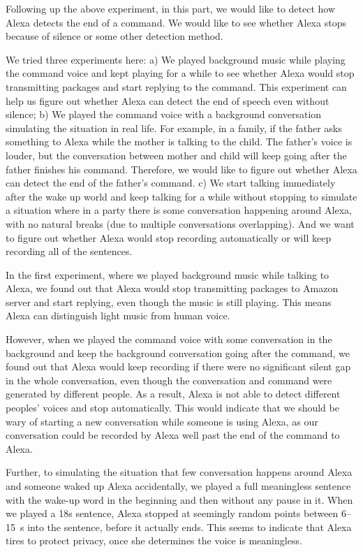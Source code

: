 Following up the above experiment, in this part, we would like to detect how Alexa detects the end of a command. We would like to see whether Alexa stops because of silence or some other detection method.

We tried three experiments here: a) We played background music while playing the command voice and kept playing for a while to see whether Alexa would stop transmitting packages and start replying to the command. This experiment can help us figure out whether Alexa can detect the end of speech even without silence; b) We played the command voice with a background conversation simulating the situation in real life. For example, in a family, if the  father asks something to Alexa while the mother is talking to the child. The father's voice is louder, but the conversation between mother and child will keep going after the father finishes his command. Therefore, we would like to figure out whether Alexa can detect the end of the father's command. c) We start talking immediately after the wake up world and keep talking for a while without stopping to simulate a situation where in a party there is some conversation happening around Alexa, with no natural breaks (due to multiple conversations overlapping). And we want to figure out whether Alexa would stop recording automatically or will keep recording all of the sentences.

In the first experiment, where we played background music while talking to Alexa, we found out that Alexa would stop transmitting packages to Amazon server and start replying, even though the music is still playing. This means Alexa can distinguish light music from human voice.

However, when we played the command voice with some conversation in the background and keep the background conversation going after the command, we found out that Alexa would keep recording if there were no significant silent gap in the whole conversation, even though the conversation and command were generated by different people. As a result, Alexa is not able to detect different peoples' voices and stop automatically. This would indicate that we should be wary of starting a new conversation while someone is using Alexa, as our conversation could be recorded by Alexa well past the end of the command to Alexa. 

Further, to simulating the situation that few conversation happens around Alexa and someone waked up Alexa accidentally, we played a full meaningless sentence with the wake-up word in the beginning and then without any pause in it. When we played a 18s sentence, Alexa stopped at seemingly random points between 6--15~s into the sentence, before it actually ends. This seems to indicate that Alexa tires to protect privacy, once she determines the voice is meaningless.

